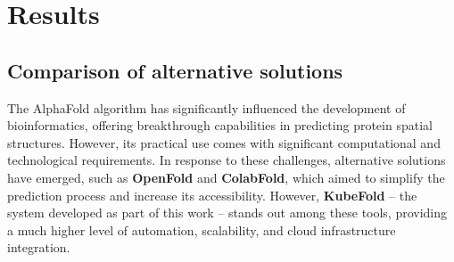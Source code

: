 \chapter{Results}
%
%

\section{Comparison of alternative solutions}

The AlphaFold algorithm has significantly influenced the development of bioinformatics, offering breakthrough capabilities in predicting protein spatial structures.
However, its practical use comes with significant computational and technological requirements.
In response to these challenges, alternative solutions have emerged, such as \textbf{OpenFold}\cite{openfold} and \textbf{ColabFold}\cite{colabfold}, which aimed to simplify the prediction process and increase its accessibility.
However, \textbf{KubeFold} – the system developed as part of this work – stands out among these tools, providing a much higher level of automation, scalability, and cloud infrastructure integration.

